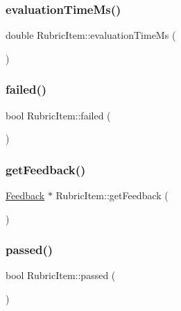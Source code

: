 \hypertarget{class_rubric_item_a34a18531cc098667fb47e440b876dc18}{}\label{class_rubric_item_a34a18531cc098667fb47e440b876dc18} 
\subsubsection{\texorpdfstring{evaluation\+Time\+Ms()}{evaluationTimeMs()}}
{\footnotesize\ttfamily double Rubric\+Item\+::evaluation\+Time\+Ms (\begin{DoxyParamCaption}{ }\end{DoxyParamCaption})}

\hypertarget{class_rubric_item_af5675f379ed58476fada3ce92ee698f0}{}\label{class_rubric_item_af5675f379ed58476fada3ce92ee698f0} 
\subsubsection{\texorpdfstring{failed()}{failed()}}
{\footnotesize\ttfamily bool Rubric\+Item\+::failed (\begin{DoxyParamCaption}{ }\end{DoxyParamCaption})}

\hypertarget{class_rubric_item_a35478d834a71b71f3726ac6e9108b97d}{}\label{class_rubric_item_a35478d834a71b71f3726ac6e9108b97d} 
\subsubsection{\texorpdfstring{get\+Feedback()}{getFeedback()}}
{\footnotesize\ttfamily \hyperlink{class_feedback}{Feedback} $\ast$ Rubric\+Item\+::get\+Feedback (\begin{DoxyParamCaption}{ }\end{DoxyParamCaption})}

\hypertarget{class_rubric_item_a0b3f8d8fd8cf27e9684510da51a58d6e}{}\label{class_rubric_item_a0b3f8d8fd8cf27e9684510da51a58d6e} 
\subsubsection{\texorpdfstring{passed()}{passed()}}
{\footnotesize\ttfamily bool Rubric\+Item\+::passed (\begin{DoxyParamCaption}{ }\end{DoxyParamCaption})}

